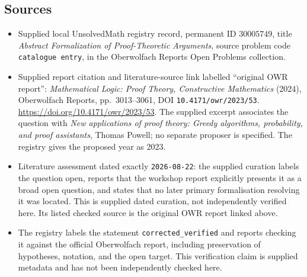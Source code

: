 \documentclass[11pt]{article}
\begin{document}
\subsection{Sources}
\begin{itemize}
\item Supplied local UnsolvedMath registry record, permanent ID \(30005749\), title \emph{Abstract Formalization of Proof-Theoretic Arguments}, source problem code \texttt{catalogue entry}, in the Oberwolfach Reports Open Problems collection.
\item Supplied report citation and literature-source link labelled ``original OWR report'': \emph{Mathematical Logic: Proof Theory, Constructive Mathematics} (2024), Oberwolfach Reports, pp.\ 3013--3061, DOI \texttt{10.4171/owr/2023/53}. \url{https://doi.org/10.4171/owr/2023/53}. The supplied excerpt associates the question with \emph{New applications of proof theory: Greedy algorithms, probability, and proof assistants}, Thomas Powell; no separate proposer is specified. The registry gives the proposed year as 2023.
\item Literature assessment dated exactly \texttt{2026-08-22}: the supplied curation labels the question open, reports that the workshop report explicitly presents it as a broad open question, and states that no later primary formalisation resolving it was located. This is supplied dated curation, not independently verified here. Its listed checked source is the original OWR report linked above.
\item The registry labels the statement \texttt{corrected\_verified} and reports checking it against the official Oberwolfach report, including preservation of hypotheses, notation, and the open target. This verification claim is supplied metadata and has not been independently checked here.
\end{itemize}
\end{document}
